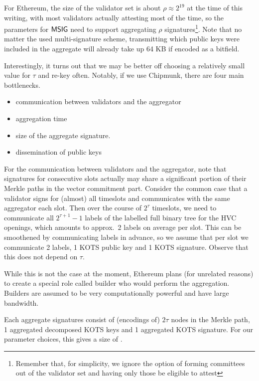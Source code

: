 For Ethereum, the size of the validator set is about $\rho\approx 2^{19}$ at the time of this writing, with most validators actually attesting most of the time, so the parameters for $\mathsf{MSIG}$ need to support aggregating $\rho$ signatures\footnote{Remember that, for simplicity, we ignore the option of forming committees out of the validator set and having only those be eligible to attest}. Note that no matter the used multi-signature scheme, transmitting which public keys were included in the aggregate will already take up 64 KB if encoded as a bitfield.

Interestingly, it turns out that we may be better off choosing a relatively small value for $\tau$ and re-key often. Notably, if we use Chipmunk, there are four main bottlenecks.
\begin{itemize}
\item communication between validators and the aggregator
\item aggregation time
\item size of the aggregate signature.
\item dissemination of public keys
\end{itemize}
For the communication between validators and the aggregator, note that signatures for consecutive slots actually may share a significant portion of their Merkle paths in the vector commitment part.
Consider the common case that a validator signs for (almost) all timeslots and communicates with the same aggregator each slot.
Then over the course of $2^\tau$ timeslots, we need to communicate all $2^{\tau+1} - 1$ labels of the labelled full binary tree for the HVC openings, which amounts to approx.\ 2 labels on average per slot.
This can be smoothened by communicating labels in advance, so we assume that per slot we communicate 2 labels, 1 KOTS public key and 1 KOTS signature.
Observe that this does not depend on $\tau$.

While this is not the case at the moment, Ethereum plans (for unrelated reasons) to create a special role called builder who would perform the aggregation. Builders are assumed to be very computationally powerful and have large bandwidth.

Each aggregate signatures consist of (encodings of) $2\tau$ nodes in the Merkle path, 1 aggregated decomposed KOTS keys and 1 aggregated KOTS signature.
For our parameter choices, this gives a size of .

